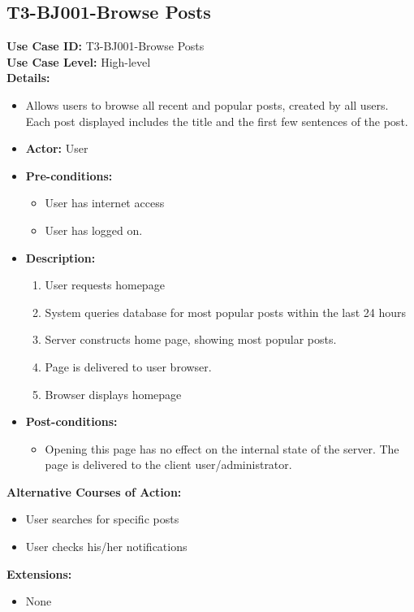 \subsection{T3-BJ001-Browse Posts}
\textbf{Use Case ID:} T3-BJ001-Browse Posts\\
\textbf{Use Case Level:} High-level\\
\textbf{Details:}
\begin{itemize}
    \item Allows users to browse all recent and popular posts, created by all users. Each post displayed includes the title and the first few sentences of the post.
    \item \textbf{Actor:} User
    \item \textbf{Pre-conditions:}
    \begin{itemize}
        \item User has internet access
        \item User has logged on.
    \end{itemize}
    \item \textbf{Description:}
    \begin{enumerate}
        \item User requests homepage
        \item System queries database for most popular posts within the last 24 hours
        \item Server constructs home page, showing most popular posts.
        \item Page is delivered to user browser.
        \item Browser displays homepage
    \end{enumerate}
    \item \textbf{Post-conditions:}
    \begin{itemize}
        \item Opening this page has no effect on the internal state of the server. The page is delivered to the client user/administrator.
    \end{itemize}
\end{itemize}
\textbf{Alternative Courses of Action:}
\begin{itemize}
    \item User searches for specific posts
    \item User checks his/her notifications
\end{itemize}
\textbf{Extensions:}
\begin{itemize}
    \item None
\end{itemize}
